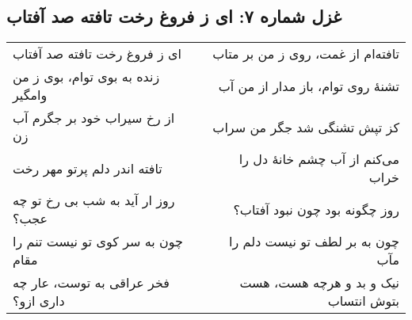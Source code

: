 \begin{center}
\section*{غزل شماره ۷: ای ز فروغ رخت تافته صد آفتاب}
\label{sec:007}
\begin{longtable}{l p{0.5cm} r}
ای ز فروغ رخت تافته صد آفتاب
&&
تافته‌ام از غمت، روی ز من بر متاب
\\
زنده به بوی توام، بوی ز من وامگیر
&&
تشنهٔ روی توام، باز مدار از من آب
\\
از رخ سیراب خود بر جگرم آب زن
&&
کز تپش تشنگی شد جگر من سراب
\\
تافته اندر دلم پرتو مهر رخت
&&
می‌کنم از آب چشم خانهٔ دل را خراب
\\
روز ار آید به شب بی رخ تو چه عجب؟
&&
روز چگونه بود چون نبود آفتاب؟
\\
چون به سر کوی تو نیست تنم را مقام
&&
چون به بر لطف تو نیست دلم را مآب
\\
فخر عراقی به توست، عار چه داری ازو؟
&&
نیک و بد و هرچه هست، هست بتوش انتساب
\\
\end{longtable}
\end{center}
